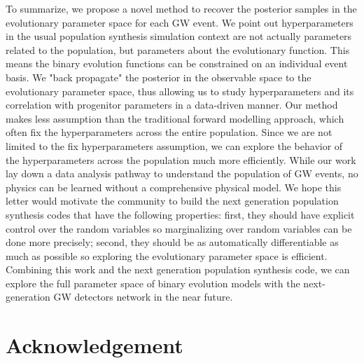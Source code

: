 \documentclass[twocolumn]{aastex631}
\begin{document}
To summarize, we propose a novel method to recover the posterior samples in the evolutionary parameter space for each GW event.
We point out hyperparameters in the usual population synthesis simulation context are not actually parameters related to the population,
but parameters about the evolutionary function.
This means the binary evolution functions can be constrained on an individual event basis.
We "back propagate" the posterior in the observable space to the evolutionary parameter space,
thus allowing us to study hyperparameters and its correlation with progenitor parameters in a data-driven manner.
Our method makes less assumption than the traditional forward modelling approach,
which often fix the hyperparameters across the entire population.
Since we are not limited to the fix hyperparameters assumption, we can explore the behavior of the hyperparameters across the population much more efficiently.
While our work lay down a data analysis pathway to understand the population of GW events,
no physics can be learned without a comprehensive physical model.
We hope this letter would motivate the community to build the next generation population synthesis codes that have the following properties:
first, they should have explicit control over the random variables so marginalizing over random variables can be done more precisely;
second, they should be as automatically differentiable as much as possible so exploring the evolutionary parameter space is efficient.
Combining this work and the next generation population synthesis code,
we can explore the full parameter space of binary evolution models with the next-generation GW detectors network in the near future.


\section{Acknowledgement}


\end{document}
